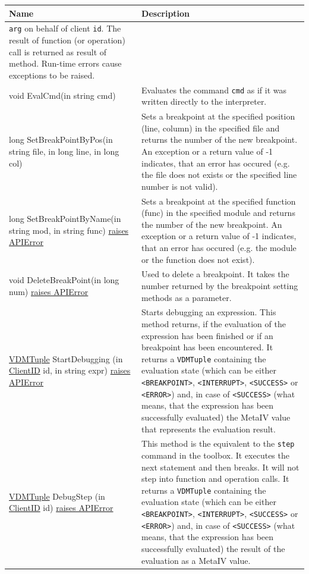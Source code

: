 \documentclass[\pformat,12pt]{article}
\newcommand{\pbs}[1]{\let\temp=\\#1\let\\=\temp}
\newenvironment{interfacetable}{%
  \begin{longtable}{|>{\pbs\raggedright\ttfamily}p{6.6cm}%
                    |>{\pbs\raggedright}p{6.6cm}|} \hline
  \textrm{\bfseries Name} &  \textbf{Description} \\ \hline
  \endhead
  }{\end{longtable}}
\newcommand{\APIError}{\hyperlink{exception.APIError}{raises APIError}}
\newcommand{\ClientID}{\hyperlink{type.ClientID}{ClientID}}
\newcommand{\VDMTuple}{\hyperlink{interface.VDMTuple}{VDMTuple}}
\begin{document}
\begin{interfacetable}
    \texttt{arg} on behalf of client \texttt{id}. The result
    of function (or operation) call is returned as result of method.
    Run-time errors cause exceptions to be raised.
\\ \hline
void EvalCmd(in string cmd) 
  & Evaluates the command \texttt{cmd} as if it was written directly to
    the interpreter. 
\\ \hline
long SetBreakPointByPos(in string file, in long line, in long col) 
  & Sets a breakpoint at the specified position (line, column) in
    the specified file and returns the number of the new breakpoint.
    An exception or a return value of -1 indicates, that an error has occured
    (e.g. the file does not exists or the specified line number is
    not valid).
\\ \hline
long SetBreakPointByName(in string mod, in string func) \APIError
  & Sets a breakpoint at the specified function (func) in the specified module and
  returns the number of the new breakpoint.
  An exception or a return value of -1 indicates, that an error has occured
  (e.g. the module or the function does not exist).
\\ \hline
void DeleteBreakPoint(in long num) \APIError
  & Used to delete a breakpoint. It takes the number returned by the breakpoint
  setting methods as a parameter.
\\ \hline
{\VDMTuple} StartDebugging (in {\ClientID} id, in string expr) \APIError 
  & Starts debugging an expression. This method returns, if the evaluation
  of the expression has been finished or if an breakpoint has been encountered.
  It returns a {\tt VDMTuple} containing the evaluation state (which can be
  either {\tt <BREAKPOINT>}, {\tt <INTERRUPT>}, {\tt <SUCCESS>} or {\tt <ERROR>})
  and, in case of {\tt <SUCCESS>} (what means, that the expression has been
  successfully evaluated)  the MetaIV value that represents the evaluation result.
\\ \hline
{\VDMTuple} DebugStep (in {\ClientID} id) \APIError 
  & This method is the equivalent to the {\tt step} command in the toolbox.
  It executes the next statement and then breaks. It will not step into
  function and operation calls.
  It returns a {\tt VDMTuple} containing the evaluation state (which can be
  either {\tt <BREAKPOINT>}, {\tt <INTERRUPT>}, {\tt <SUCCESS>} or {\tt <ERROR>})
  and, in case of {\tt <SUCCESS>} (what means, that the expression has been
  successfully evaluated)  the result of the evaluation as a MetaIV value.

\end{interfacetable}
\end{document}
